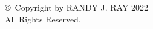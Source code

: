 \thispagestyle{empty}
\mbox{}
\vfill
\begin{center}
\copyright \ Copyright by RANDY J. RAY 2022 \\
All Rights Reserved.
\end{center}
\pagebreak
